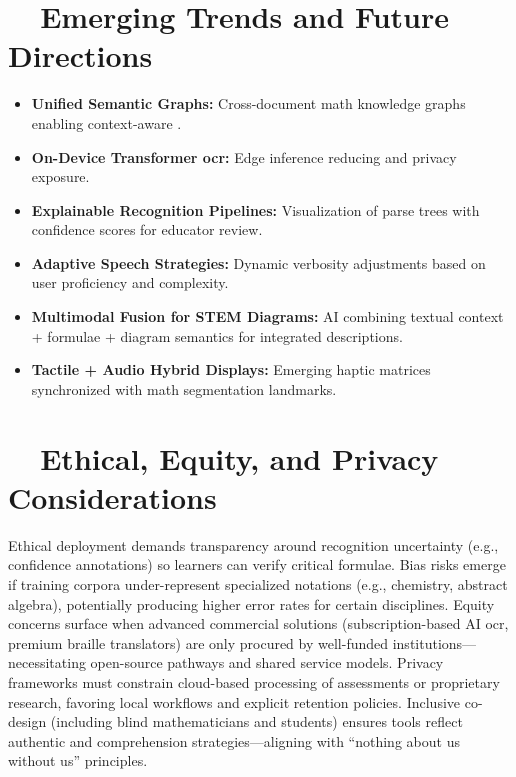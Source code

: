 \section{~~Emerging Trends and Future Directions}\label{ch11:sec:emerging-trends}
\begin{itemize}
	\item \textbf{Unified Semantic Graphs:} Cross-document math knowledge graphs enabling context-aware .\supercite{IBMSemanticAI}
	\item \textbf{On-Device Transformer \gls{ocr}:} Edge inference reducing  and privacy exposure.\supercite{DeepLearningOCROverview}
	\item \textbf{Explainable Recognition Pipelines:} Visualization of parse trees with confidence scores for educator review.
	\item \textbf{Adaptive Speech Strategies:} Dynamic verbosity adjustments based on user proficiency and complexity.
	\item \textbf{Multimodal Fusion for STEM Diagrams:} AI combining textual context + formulae + diagram semantics for integrated descriptions.\supercite{AI_Ethics_Bias}
	\item \textbf{Tactile + Audio Hybrid Displays:} Emerging haptic matrices synchronized with math segmentation landmarks.
\end{itemize}

\section{~~Ethical, Equity, and Privacy Considerations}\label{ch11:sec:ethics-equity-privacy}
Ethical deployment demands transparency around recognition uncertainty (e.g., confidence annotations) so learners can verify critical formulae. Bias risks emerge if training corpora under-represent specialized notations (e.g., chemistry, abstract algebra), potentially producing higher error rates for certain disciplines.\supercite{Bias_in_AI} Equity concerns surface when advanced commercial solutions (subscription-based AI \gls{ocr}, premium braille translators) are only procured by well-funded institutions—necessitating open-source pathways and shared service models. Privacy frameworks must constrain cloud-based processing of assessments or proprietary research, favoring local workflows and explicit retention policies.\supercite{DataPrivacyAI} Inclusive co-design (including blind mathematicians and students) ensures tools reflect authentic  and comprehension strategies—aligning with “nothing about us without us” principles.\supercite{AI_Ethics_Bias}

